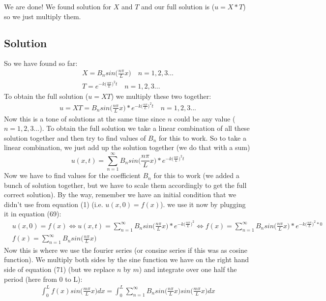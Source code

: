 \documentclass[11pt]{article}
\begin{document}
We are done! We found solution for $X$ and $T$ and our full solution is ($u=X*T$) so we just multiply them.
\subsection{Solution}
So we have found so far:
\begin{align}
	X=B_nsin\bigg(\frac{n\pi}{L} x\bigg) \quad n=1,2,3... \\
	T=e^{-k\big(\frac{n\pi}{L}\big)^2t} \quad n=1,2,3...
\end{align}
To obtain the full solution ($u=XT$) we multiply these two together:
\begin{align}
	u=XT=B_nsin\bigg(\frac{n\pi}{L} x\bigg)*e^{-k\big(\frac{n\pi}{L}\big)^2t} \quad n=1,2,3...
\end{align}
Now this is a tone of solutions at the same time since $n$ could be any value ($n=1,2,3...$). To obtain the full solution we take a linear combination of all these solution together and then try to find values of $B_n$ for this to work. So to take a linear combination, we just add up the solution together (we do that with a sum)
\begin{equation}
	u(x,t) = \sum_{n=1}^{\infty} B_nsin\bigg(\frac{n\pi}{L} x\bigg)*e^{-k\big(\frac{n\pi}{L}\big)^2t}
\end{equation}
Now we have to find values for the coefficient $B_n$ for this to work (we added a bunch of solution together, but we have to scale them accordingly to get the full correct solution). By the way, remember we have an initial condition that we didn't use from equation (1) (i.e. $u(x,0) = f(x)$). we use it now by plugging it in equation (69):
\begin{align}
	&u(x,0) = f(x) \Longleftrightarrow u(x,t) = \sum_{n=1}^{\infty} B_nsin\bigg(\frac{n\pi}{L} x\bigg)*e^{-k\big(\frac{n\pi}{L}\big)^2} \Longleftrightarrow f(x) = \sum_{n=1}^{\infty} B_nsin\bigg(\frac{n\pi}{L} x\bigg)*e^{-k\big(\frac{n\pi}{L}\big)^2*0}\\
	&f(x) = \sum_{n=1}^{\infty} B_nsin\bigg(\frac{n\pi}{L} x\bigg)
\end{align}
Now this is where we use the fourier series (or consine series if this was as cosine function). We multiply both sides by the sine function we have on the right hand side of equation (71) (but we replace $n$ by $m$) and integrate over one half the period (here from 0 to L):
\begin{align}
	\int_0^L f(x)sin\bigg(\frac{m\pi}{L} x\bigg)dx = \int_0^L \sum_{n=1}^{\infty} B_nsin\bigg(\frac{n\pi}{L} x\bigg)sin\bigg(\frac{m\pi}{L} x\bigg)dx
\end{align}
\end{document}
